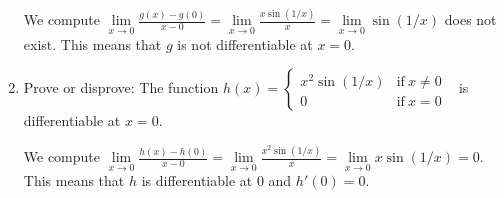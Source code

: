 \documentclass[12pt]{amsart}
\numberwithin{equation}{section}
\theoremstyle{plain} %
\theoremstyle{definition}
\theoremstyle{remark}
\begin{document}
\begin{enumerate}
\begin{framed}
We compute $\lim\limits_{x\to 0} \frac{g(x) - g(0)}{x-0}= \lim\limits_{x\to 0} \frac{x \sin(1/x)}{x} = \lim\limits_{x\to 0} \sin(1/x)$ does not exist. This means that $g$ is not differentiable at $x=0$.
\end{framed}


\item Prove or disprove: The function $h(x) = \begin{cases} x^2 \sin(1/x) &\text{if} \ x \neq 0 \\ 0 & \text{if} \ x=0\end{cases}$ \  is differentiable at $x=0$.

\begin{framed}
We compute $\lim\limits_{x\to 0} \frac{h(x) - h(0)}{x-0}= \lim\limits_{x\to 0} \frac{x^2 \sin(1/x)}{x} = \lim\limits_{x\to 0} x\sin(1/x)=0$. This means that $h$ is differentiable at $0$ and $h'(0)=0$. 
\end{framed}

 \end{enumerate}
\end{document}
